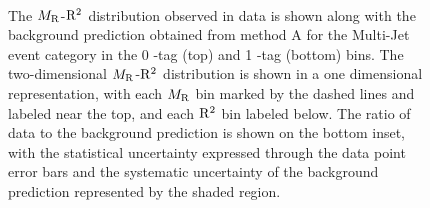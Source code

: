 \begin{figure}[!htb] \centering
{}\\
\caption{ The $M_\mathrm{R}$-$\mathrm{R}^2$ distribution observed in data is shown along with the background prediction
obtained from method A for the Multi-Jet event category in the 0
\PQb-tag (top) and 1 \PQb-tag (bottom) bins. The two-dimensional $M_\mathrm{R}$-$\mathrm{R}^2$ distribution is shown
in a one dimensional representation, with each $M_\mathrm{R}$ bin marked by the dashed lines and labeled near the top,
and each $\mathrm{R}^2$ bin labeled below. The ratio of data to the background prediction is shown on the bottom inset, with
the statistical uncertainty expressed through the data point error bars and the systematic uncertainty of the
background prediction represented by the shaded region. 
}
\label{fig:ResultsMultiJet0btag1btag}
\end{figure}

